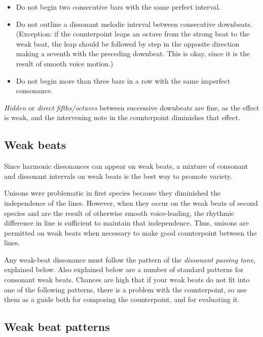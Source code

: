 \documentclass{book}
\providecommand{\tightlist}{%
  \setlength{\itemsep}{0pt}\setlength{\parskip}{0pt}}
\begin{document}
\begin{itemize}
\tightlist
\item
  Do not begin two consecutive bars with the same perfect interval.\\
\item
  Do not outline a dissonant melodic interval between consecutive downbeats.
  (Exception: if the counterpoint leaps an octave from the strong beat to the
  weak beat, the leap should be followed by step in the opposite direction
  making a seventh with the preceding downbeat. This is okay, since it is the
  result of smooth voice motion.)\\
\item
  Do not begin more than three bars in a row with the same imperfect
  consonance.
\end{itemize}

\emph{Hidden} or \emph{direct fifths/octaves} between successive downbeats are
fine, as the effect is weak, and the intervening note in the counterpoint
diminishes that effect.

\hypertarget{weak-beats}{%
\subsection{Weak beats}\label{weak-beats}}

Since harmonic dissonances can appear on weak beats, a mixture of consonant
and dissonant intervals on weak beats is the best way to promote variety.

Unisons were problematic in first species because they diminished the
independence of the lines. However, when they occur on the weak beats of
second species and are the result of otherwise smooth voice-leading, the
rhythmic difference in line is sufficient to maintain that independence. Thus,
unisons are permitted on weak beats when necessary to make good counterpoint
between the lines.

Any weak-beat dissonance must follow the pattern of the \emph{dissonant
passing tone}, explained below. Also explained below are a number of standard
patterns for consonant weak beats. Chances are high that if your weak beats do
not fit into one of the following patterns, there is a problem with the
counterpoint, so use them as a guide both for composing the counterpoint, and
for evaluating it.

\hypertarget{weak-beat-patterns}{%
\subsection{Weak beat patterns}\label{weak-beat-patterns}}
\end{document}
